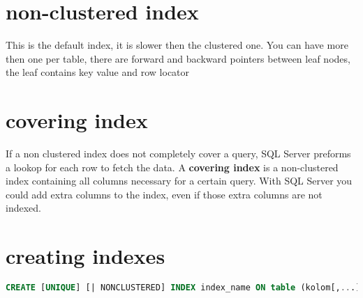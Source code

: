 \documentclass{report}
\begin{document}
		\section{non-clustered index}
			This is the default index, it is slower then the clustered one. You can have more then one per table, there are forward and backward pointers between leaf nodes, the leaf contains key value and row locator
		\section{covering index}
			If a non clustered index does not completely cover a query, SQL Server preforms a lookop for each row to fetch the data. A \textbf{covering index} is a non-clustered index containing all columns necessary for a certain query. With SQL Server you could add extra columns to the index, even if those extra columns are not indexed. 
		\section{creating indexes}
			\begin{lstlisting}[language = sql]
CREATE [UNIQUE] [| NONCLUSTERED] INDEX index_name ON table (kolom[,...])\end{lstlisting}
\end{document}
